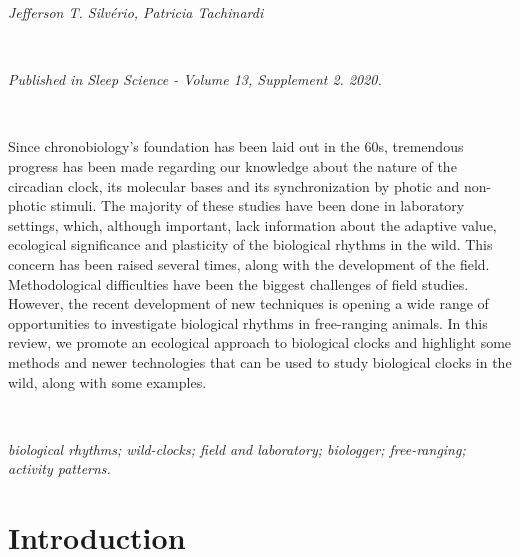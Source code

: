 \documentclass[msc,numbers,hidelinks]{coppe}
\begin{document}
  \emph{Jefferson T. Silvério, Patricia Tachinardi}

  ~

  \emph{Published in Sleep Science - Volume 13, Supplement 2. 2020.}

  ~

  Since chronobiology's foundation has been laid out in the 60s, tremendous progress has been made regarding our knowledge about the nature of the circadian clock, its molecular bases and its synchronization by photic and non-photic stimuli. The majority of these studies have been done in laboratory settings, which, although important, lack information about the adaptive value, ecological significance and plasticity of the biological rhythms in the wild. This concern has been raised several times, along with the development of the field. Methodological difficulties have been the biggest challenges of field studies. However, the recent development of new techniques is opening a wide range of opportunities to investigate biological rhythms in free-ranging animals. In this review, we promote an ecological approach to biological clocks and highlight some methods and newer technologies that can be used to study biological clocks in the wild, along with some examples.

  ~

  \emph{biological rhythms; wild-clocks; field and laboratory; biologger; free-ranging; activity patterns.}

  \hypertarget{introduction}{%
  \section{Introduction}\label{introduction}}
\end{document}
